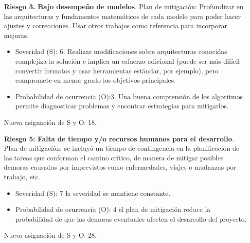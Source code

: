 \documentclass[
11pt %
]{charter}
\begin{document}
\textbf{Riesgo 3. Bajo desempeño de modelos}. Plan de mitigación: Profundizar en las arquitecturas y fundamentos matemáticos de cada modelo para poder hacer ajustes y correcciones. Usar otros trabajos como referencia para incorporar mejoras.
\begin{itemize}
	\item Severidad (S): 6. Realizar modificaciones sobre arquitecturas conocidas complejiza la solución e implica un esfuerzo adicional (puede ser más difícil convertir formatos y usar herramientas estándar, por ejemplo), pero compromete en menor grado los objetivos principales.
	\item Probabilidad de ocurrencia (O):3. Una buena comprensión de los algoritmos permite diagnosticar problemas y encontrar estrategias para mitigarlos.
\end{itemize}
Nueva asignación de S y O: 18.

\textbf{Riesgo 5: Falta de tiempo y/o recursos humanos para el desarrollo}. Plan de mitigación: se incluyó un tiempo de contingencia en la planificación de las tareas que conforman el camino crítico, de manera de mitigar posibles demoras causadas por imprevistos como enfermedades, viajes o mudanzas por trabajo, etc.
\begin{itemize}
	\item Severidad (S): 7 la severidad se mantiene constante.
	\item Probabilidad de ocurrencia (O): 4 el plan de mitigación reduce la probabilidad de que las demoras eventuales afecten el desarrollo del proyecto.
\end{itemize}
Nueva asignación de S y O: 28.
\end{document}
